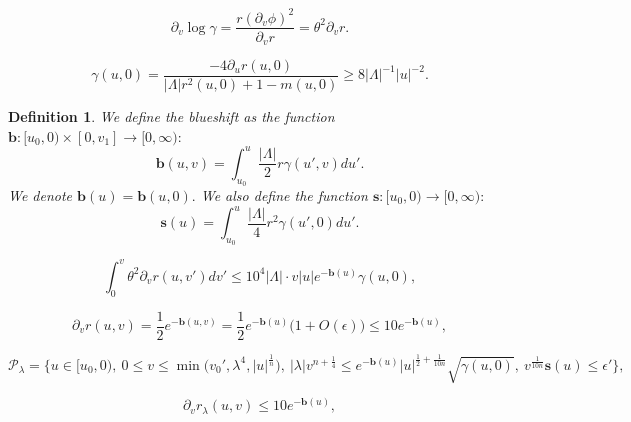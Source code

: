 \documentclass[10pt,a4paper]{amsart}
\newtheorem{definition}{Definition}
\begin{document}
\begin{equation}\label{dv log gamma}
    \partial_v\log\gamma=\frac{r(\partial_v\phi)^2}{\partial_vr}=\theta^2\partial_vr.
\end{equation}

\begin{equation}\label{gamma lower bound on C0-}
    \gamma(u,0)=\frac{-4\partial_ur(u,0)}{|\Lambda|r^2(u,0)+1-m(u,0)}\geq8|\Lambda|^{-1}|u|^{-2}.
\end{equation}

\begin{definition}\label{blueshift definition}
    We define the blueshift as the function $\mathbf{b}:[u_0,0)\times[0,v_1]\rightarrow[0,\infty):$
    \begin{equation}\label{blueshift definition eq}
        \mathbf{b}(u,v)=\int_{u_0}^u\frac{|\Lambda|}{2}r\gamma(u',v)du'.
    \end{equation}
    We denote $\mathbf{b}(u)=\mathbf{b}(u,0).$ We also define the function $\mathbf{s}:[u_0,0)\rightarrow[0,\infty):$
    \begin{equation}\label{blueshift strength definition}
        \mathbf{s}(u)=\int_{u_0}^u\frac{|\Lambda|}{4}r^2\gamma(u',0)du'.
    \end{equation}
\end{definition}

    \begin{equation}\label{background energy bound 1}
    \int_0^v\theta^2\partial_vr(u,v')dv'\leq10^4|\Lambda|\cdot v|u|e^{-\mathbf{b}(u)}\gamma(u,0),
    \end{equation}

\begin{equation}\label{dv r in terms of b(u)}
    \partial_vr(u,v)=\frac{1}{2}e^{-\mathbf{b}(u,v)}=\frac{1}{2}e^{-\mathbf{b}(u)}\big(1+O(\epsilon)\big)\leq 10e^{-\mathbf{b}(u)},
\end{equation}

    \begin{equation}\label{definition of P lambda}
    \mathcal{P}_{\lambda}=\bigg\{u\in[u_0,0),\ 0\leq v\leq\min\big(v_0',\lambda^4,|u|^{\frac{1}{n}}\big),\ |\lambda| v^{n+\frac{1}{4}}\leq e^{-\mathbf{b}(u)}|u|^{\frac{1}{2}+\frac{1}{10n}}\sqrt{\gamma(u,0)},\ v^{\frac{1}{10n}}\mathbf{s}(u)\leq\epsilon'\bigg\},
    \end{equation}

\begin{equation}\label{A1 blueshift instability}
    \partial_vr_{\lambda}(u,v)\leq 10e^{-\mathbf{b}(u)},
\end{equation}
\end{document}
